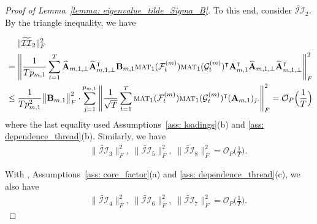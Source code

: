 \documentclass[aos]{imsart}
\theoremstyle{plain}
\theoremstyle{definition}
\def\mat{\textnormal{\textsc{mat}}}
\def\wt#1{\widetilde{#1}}
\def\wh#1{\widehat{#1}}
\def\cF{\mathcal{F}}
\def\cG{\mathcal{G}} \def\cH{\boldsymbol{\mathcal{H}}} \def\cI{\mathcal{I}}
\def\cII{\mathcal{II}}
\def\cO{\mathcal{O}}
\def\bA{\mathbf{A}}
\def\bB{\mathbf{B}}
\def\trans{\intercal}
\begin{document}
\begin{proof}[Proof of Lemma~\ref{lemma: eigenvalue_tilde_Sigma_B}]
To this end, consider $\wt\cII_2$. By the triangle inequality, we have

\begin{align}
    &\;\quad
    \|\wt\cII_2\|_F^2 \notag \\
    &=
    \Bigg\| \frac{1}{T p_{m,1}} \sum_{t=1}^T \wh{\bA}_{m,1,\perp} \wh{\bA}_{m,1,\perp}^\trans \bB_{m,1} \mat_1(\cF_t^{(m)}) \mat_1(\cG_t^{(m)})^\trans \bA_{m,1}^\trans \wh{\bA}_{m,1,\perp} \wh{\bA}_{m,1,\perp}^\trans \Bigg\|_F^2 \notag \\
    &\leq
    \frac{1}{T p_{m,1}^2} \big\|\bB_{m,1} \big\|_F^2 \cdot \sum_{j=1}^{p_{m,1}} \Bigg\| \frac{1}{\sqrt{T}} \sum_{t=1}^T \mat_1(\cF_t^{(m)}) \mat_1(\cG_t^{(m)})^\trans (\bA_{m,1})_{j\cdot} \Bigg\|_F^2 
    = \cO_P\Big( \frac{1}{T} \Big)
    \label{eqn: tilde_cII_2}
\end{align}
where the last equality used Assumptions~\ref{ass: loadings}(b) and \ref{ass: dependence_thread}(b). Similarly, we have
\begin{align}
    &\;\quad
    \|\wt\cII_3\|_F^2, \;
    \|\wt\cII_5\|_F^2, \;
    \|\wt\cII_8\|_F^2
    = \cO_P\Big( \frac{1}{T} \Big) .
    \label{eqn: tilde_cII_3_5_8}
\end{align}

With , Assumptions~\ref{ass: core_factor}(a) and \ref{ass: dependence_thread}(c), we also have 
\begin{align}
    &\;\quad
    \|\wt\cII_4\|_F^2, \;
    \|\wt\cII_6\|_F^2, \;
    \|\wt\cII_7\|_F^2
    = \cO_P\Big( \frac{1}{T} \Big) .
    \label{eqn: tilde_cII_4_6_7}
\end{align}


\end{proof}
\end{document}
